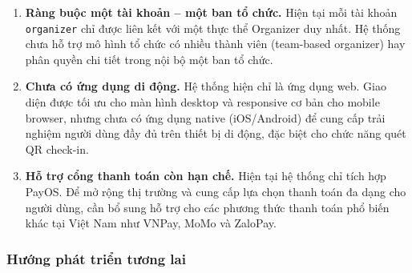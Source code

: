 \begin{enumerate}[leftmargin=*, label=\textbf{\arabic*.}]
    \item \textbf{Ràng buộc một tài khoản -- một ban tổ chức.}
    Hiện tại mỗi tài khoản \texttt{organizer} chỉ được liên kết với một
    thực thể Organizer duy nhất. Hệ thống chưa hỗ trợ mô hình tổ chức
    có nhiều thành viên (team-based organizer) hay phân quyền chi tiết
    trong nội bộ một ban tổ chức.

    \item \textbf{Chưa có ứng dụng di động.}
    Hệ thống hiện chỉ là ứng dụng web. Giao diện được tối ưu cho màn
    hình desktop và responsive cơ bản cho mobile browser, nhưng chưa có
    ứng dụng native (iOS/Android) để cung cấp trải nghiệm người dùng
    đầy đủ trên thiết bị di động, đặc biệt cho chức năng quét QR check-in.

    \item \textbf{Hỗ trợ cổng thanh toán còn hạn chế.}
    Hiện tại hệ thống chỉ tích hợp PayOS. Để mở rộng thị trường và 
    cung cấp lựa chọn thanh toán đa dạng cho người dùng, cần bổ sung 
    hỗ trợ cho các phương thức thanh toán phổ biến khác tại Việt Nam 
    như VNPay, MoMo và ZaloPay.

\end{enumerate}

\subsubsection*{Hướng phát triển tương lai}

